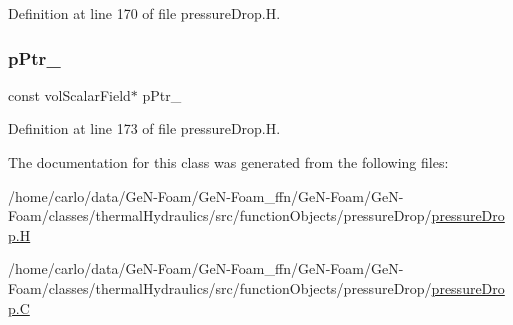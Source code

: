 Definition at line 170 of file pressure\+Drop.\+H.

\mbox{\label{classFoam_1_1functionObjects_1_1pressureDrop_a1d88f9fab57e2981aec827b26b5f9518}} 
\subsubsection{\texorpdfstring{p\+Ptr\+\_\+}{pPtr\_}}
{\footnotesize\ttfamily const vol\+Scalar\+Field$\ast$ p\+Ptr\+\_\+\hspace{0.3cm}{\ttfamily [protected]}}



Definition at line 173 of file pressure\+Drop.\+H.



The documentation for this class was generated from the following files\+:\begin{DoxyCompactItemize}
\item 
/home/carlo/data/\+Ge\+N-\/\+Foam/\+Ge\+N-\/\+Foam\+\_\+ffn/\+Ge\+N-\/\+Foam/\+Ge\+N-\/\+Foam/classes/thermal\+Hydraulics/src/function\+Objects/pressure\+Drop/\hyperlink{pressureDrop_8H}{pressure\+Drop.\+H}\item 
/home/carlo/data/\+Ge\+N-\/\+Foam/\+Ge\+N-\/\+Foam\+\_\+ffn/\+Ge\+N-\/\+Foam/\+Ge\+N-\/\+Foam/classes/thermal\+Hydraulics/src/function\+Objects/pressure\+Drop/\hyperlink{pressureDrop_8C}{pressure\+Drop.\+C}\end{DoxyCompactItemize}

